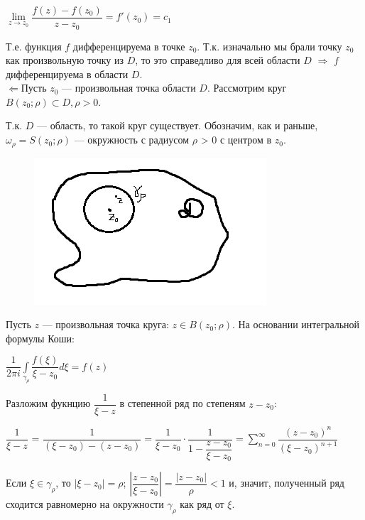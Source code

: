 \documentclass[a4paper, 12pt]{report}
\begin{document}
\begin{center}
    $\lim\limits_{z\to z_0} \dfrac{f(z) - f(z_0)}{z - z_0} = f'(z_0) = c_1$
\end{center}

Т.е. функция $f$ дифференцируема в точке $z_0$. Т.к. изначально мы брали точку $z_0$ как произвольную точку из $D$, то это справедливо для всей области $D$ $\Rightarrow$ $f$ дифференцируема в области $D$.\bigskip\\
\bigskip
$\Leftarrow$\quad Пусть $z_0$ --- произвольная точка области $D$. Рассмотрим круг $B(z_0; \rho) \subset D, \rho  > 0$.\par Т.к. $D$ --- область, то такой круг существует. Обозначим, как и раньше, $\omega_{\rho} = S(z_0; \rho)$ --- окружность с радиусом $\rho$ > 0 с центром в $z_0$.
\par\bigskip\par\bigskip
\begin{figure} 
    \vspace{-5ex}
    \includegraphics{oblD.png}
\end{figure}
Пусть $z$ --- произвольная точка круга: $z \in B(z_0; \rho)$. На основании интегральной формулы Коши:

\begin{center}
    $\dfrac{1}{2\pi i}\int\limits_{\gamma_{\rho}}\dfrac{f(\xi)}{\xi - z_0}d\xi = f(z)$
\end{center}

Разложим фукнцию $\dfrac{1}{\xi - z}$ в степенной ряд по степеням $z - z_0$:

\begin{center}
    $\dfrac{1}{\xi - z}$ = $\dfrac{1}{(\xi - z_0) - (z - z_0)} = \dfrac{1}{\xi - z_0}\cdot\dfrac{1}{1 - \dfrac{z - z_0}{\xi - z_0}} = \sum\limits_{n=0}^{\infty}\dfrac{(z - z_0)^n}{(\xi - z_0)^{n + 1}}$
\end{center}

Если $\xi \in \gamma_{\rho}$, то $|\xi - z_0| = \rho$; $|\dfrac{z - z_0}{\xi - z_0}| = \dfrac{|z - z_0|}{\rho} < 1$ и, значит, полученный ряд сходится равномерно на окружности $\gamma_{\rho}$ как ряд от $\xi$.
\end{document}
